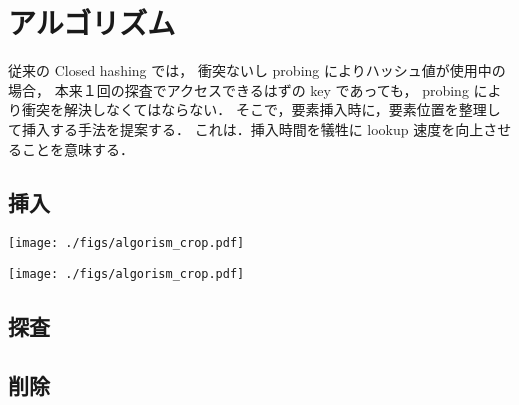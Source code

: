 \chapter{アルゴリズム}
\label{chap_Algorism}

従来の Closed hashing では，
衝突ないし probing によりハッシュ値が使用中の場合，
本来１回の探査でアクセスできるはずの key であっても，
probing により衝突を解決しなくてはならない．
そこで，要素挿入時に，要素位置を整理して挿入する手法を提案する．
これは．挿入時間を犠牲に lookup 速度を向上させることを意味する．

\section{挿入}

\begin{center}
  \texttt{[image: ./figs/algorism\_crop.pdf]}
\end{center}

\begin{center}
\texttt{[image: ./figs/algorism\_crop.pdf]}
\end{center}

\section{探査}
\section{削除}










